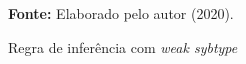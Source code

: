 \begin{figure}[ht!]
\centering

\caption{\textmd{Regra de inferência com \textit{weak sybtype}}}
\label{fig:weak}

\par\medskip\textbf{Fonte:} Elaborado pelo autor (2020). \par\medskip

\end{figure}

